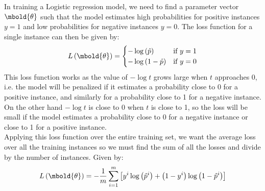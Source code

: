 \documentclass[12pt letter]{report}
\begin{document}
In training a Logistic regression model, we need to find a parameter vector $\mbold{\theta}$ such that the model
estimates high probabilities for positive instances $y = 1$ and low probabilities for negative instances $y = 0$. The
loss function for a single instance can then be given by:
\[
  L \left( \mbold{\theta} \right)  = \begin{cases}
    - \log \left( \hat{p} \right)     & \text{if } y = 1 \\
    - \log \left( 1 - \hat{p} \right) & \text{if } y = 0
  \end{cases}
\]
This loss function works as the value of $-\log t$ grows large when $t$ approaches 0, i.e. the model will be penalized
if it estimates a probability close to 0 for a positive instance, and similarly for a probability close to 1 for a
negative instance. On the other hand $- \log t$ is close to 0 when $t$ is close to 1, so the loss will be small if the
model estimates a probability close to 0 for a negative instance or close to 1 for a positive instance. \\

Applying this loss function over the entire training set, we want the average loss over all the training instances so we
must find the sum of all the losses and divide by the number of instances. Given by:
\[
  L \left( \mbold{\theta} \right)  = -\frac{1}{m} \displaystyle\sum_{i=1}^{m} \left[ y^{i} \log \left( \hat{p}^{i}
    \right) + \left( 1 - y^{i} \right) \log \left( 1 - \hat{p}^{i} \right)    \right]
\]
\end{document}
